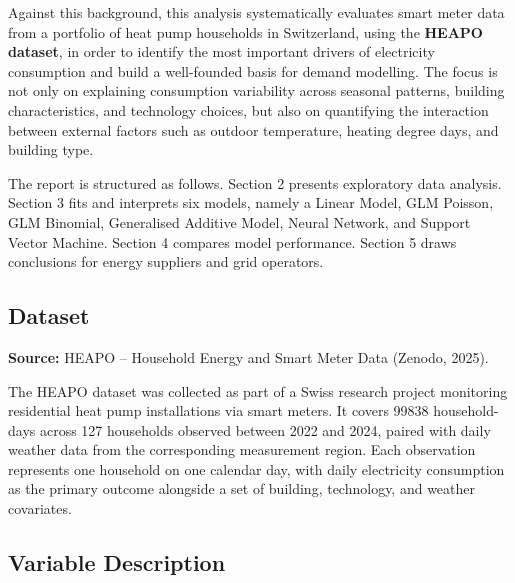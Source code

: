 \documentclass[
]{article}
\begin{document}
Against this background, this analysis systematically evaluates smart
meter data from a portfolio of heat pump households in Switzerland,
using the \textbf{HEAPO dataset}, in order to identify the most
important drivers of electricity consumption and build a well-founded
basis for demand modelling. The focus is not only on explaining
consumption variability across seasonal patterns, building
characteristics, and technology choices, but also on quantifying the
interaction between external factors such as outdoor temperature,
heating degree days, and building type.

The report is structured as follows. Section 2 presents exploratory data
analysis. Section 3 fits and interprets six models, namely a Linear
Model, GLM Poisson, GLM Binomial, Generalised Additive Model, Neural
Network, and Support Vector Machine. Section 4 compares model
performance. Section 5 draws conclusions for energy suppliers and grid
operators.

\subsection{Dataset}\label{dataset}

\textbf{Source:} HEAPO -- Household Energy and Smart Meter Data (Zenodo,
2025).

The HEAPO dataset was collected as part of a Swiss research project
monitoring residential heat pump installations via smart meters. It
covers 99838 household-days across 127 households observed between 2022
and 2024, paired with daily weather data from the corresponding
measurement region. Each observation represents one household on one
calendar day, with daily electricity consumption as the primary outcome
alongside a set of building, technology, and weather covariates.

\subsection{Variable Description}\label{variable-description}
\end{document}
